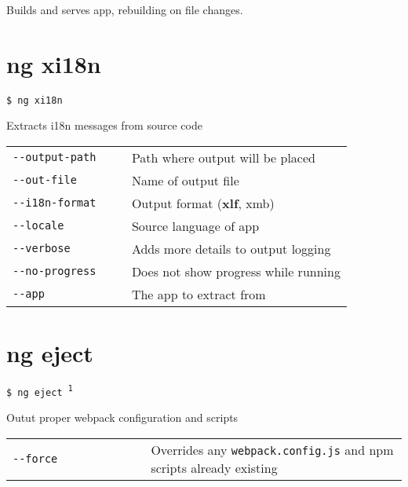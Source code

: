 \documentclass[8pt]{extarticle} %
\begin{document}
\begin{multicols}{3}
  \vspace{0.6ex}

  {\small Builds and serves app, rebuilding on file changes.}

\section*{ng xi18n}

  \vspace{1ex}
  {\tt \$ ng xi18n \itt{[options...]}}

  \vspace{0.6ex}

  {\small Extracts i18n messages from source code}

  \vspace{0.6ex}

  \begin{tabular}{L{0.35\linewidth} L{0.65\linewidth}}
    \tt -{}-output-path  & \small Path where output will be placed \\
    \tt -{}-out-file  & \small Name of output file \\
    \tt -{}-i18n-format  & \small Output format ({\bf xlf}, xmb)\\
    \tt -{}-locale  & \small Source language of app \\
    \tt -{}-verbose  & \small Adds more details to output logging \\
    \tt -{}-no-progress  & \small Does not show progress while running \\
    \tt -{}-app  & \small The app to extract from 
  \end{tabular}

\section*{ng eject}

  \vspace{1ex}
  {\tt \$ ng eject \textsuperscript{1} \itt{[options...]}}

  \vspace{0.6ex}

  {\small Outut proper webpack configuration and scripts}

  \vspace{0.6ex}

  \begin{tabular}{L{0.35\linewidth} L{0.65\linewidth}}
    \tt -{}-force & \small Overrides any {\tt webpack.config.js} and npm scripts already existing
  \end{tabular}


\end{multicols}
\end{document}
